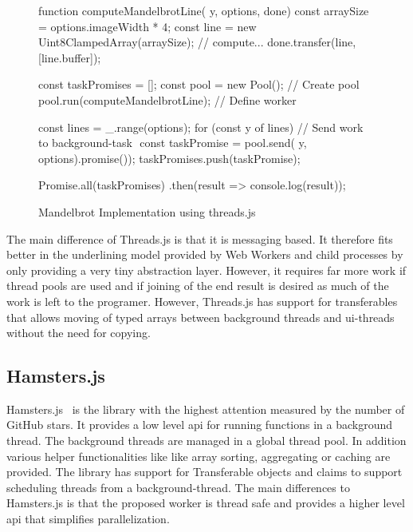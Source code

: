\begin{figure}
	\begin{javascriptcode}
function computeMandelbrotLine({ y, options}, done) {
	const arraySize = options.imageWidth * 4;
    const line = new Uint8ClampedArray(arraySize);
    // compute...
    done.transfer(line, [line.buffer]);
}

const taskPromises = [];
const pool = new Pool(); // Create pool $\label{code:threadsjs-pool}$
pool.run(computeMandelbrotLine); // Define worker $\label{code:threadsjs-worker}$

const lines = _.range(options);
for (const y of lines) {
	// Send work to background-task $\label{code:threadsjs-messaging}$
	const taskPromise = pool.send({ y, options}).promise());
	taskPromises.push(taskPromise);
}

Promise.all(taskPromises)
	.then(result => console.log(result));	
\end{javascriptcode}
\caption{Mandelbrot Implementation using threads.js}
\label{fig:mandelbrot-threadsjs}
\end{figure}

The main difference of Threads.js is that it is messaging based. It therefore fits better in the underlining model provided by Web Workers and child processes by only providing a very tiny abstraction layer. However, it requires far more work if thread pools are used and if joining of the end result is desired as much of the work is left to the programer. However, Threads.js has support for transferables~\cite[Section 2.7.4]{w3cHtml5} that allows moving of typed arrays between background threads and ui-threads without the need for copying. 


\subsection{Hamsters.js}
Hamsters.js~\cite{hamstersjs} is the library with the highest attention measured by the number of GitHub stars. It provides a low level api for running functions in a background thread. The background threads are managed in a global thread pool. In addition various helper functionalities like like array sorting, aggregating or caching are provided. The library has support for Transferable objects and claims to support scheduling threads from a background-thread. The main differences to Hamsters.js is that the proposed worker is thread safe and provides a higher level api that simplifies parallelization. 

